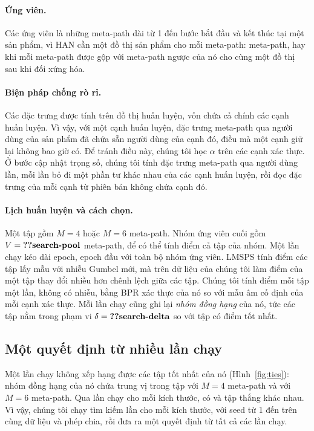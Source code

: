 \paragraph{Ứng viên.} Các ứng viên là những meta-path dài từ 1 đến  bước bắt đầu và
kết thúc tại một sản phẩm, vì HAN cần một đồ thị sản phẩm cho mỗi meta-path:
 meta-path, hay  khi mỗi meta-path được gộp với meta-path
ngược của nó cho cùng một đồ thị sau khi đối xứng hóa.

\paragraph{Biện pháp chống rò rỉ.} Các đặc trưng được tính trên đồ thị huấn luyện, vốn chứa cả chính
các cạnh huấn luyện. Vì vậy, với một cạnh huấn luyện, đặc trưng meta-path qua người dùng của sản phẩm
đã chứa sẵn người dùng của cạnh đó, điều mà một cạnh giữ lại không bao giờ có. Để tránh điều này,
chúng tôi học $\alpha$ trên các cạnh xác thực. Ở bước cập nhật trọng số, chúng tôi tính đặc trưng
meta-path qua người dùng  lần, mỗi lần bỏ đi một phần tư khác nhau của các cạnh
huấn luyện, rồi đọc đặc trưng của mỗi cạnh từ phiên bản không chứa cạnh đó.

\paragraph{Lịch huấn luyện và cách chọn.} Một tập gồm $M = 4$ hoặc $M = 6$ meta-path. Nhóm ứng
viên cuối gồm $V = \val{search-pool}$ meta-path, để có thể tính điểm cả  tập của nhóm. Một lần chạy
kéo dài  epoch,  epoch đầu với toàn bộ nhóm ứng viên. LMSPS
tính điểm các tập lấy mẫu với nhiễu Gumbel mới, mà trên dữ liệu của chúng tôi làm điểm của một tập
thay đổi nhiều hơn chênh lệch giữa các tập. Chúng tôi tính điểm mỗi tập một lần, không có nhiễu,
bằng BPR xác thực của nó so với  mẫu âm cố định của mỗi cạnh xác thực. Mỗi lần
chạy cũng ghi lại \emph{nhóm đồng hạng} của nó, tức các tập nằm trong phạm vi
$\delta = \val{search-delta}$ so với tập có điểm tốt nhất.

\subsection{Một quyết định từ nhiều lần chạy}
\label{sec:fleet}

Một lần chạy không xếp hạng được các tập tốt nhất của nó (Hình~\ref{fig:ties}): nhóm đồng hạng
của nó chứa trung vị  trong  tập với $M = 4$ meta-path và
 với $M = 6$ meta-path. Qua  lần chạy cho mỗi kích thước, có
 và  tập thắng khác nhau. Vì vậy, chúng tôi chạy tìm
kiếm  lần cho mỗi kích thước, với seed từ 1 đến  trên cùng dữ liệu
và phép chia, rồi đưa ra một quyết định từ tất cả các lần chạy.

